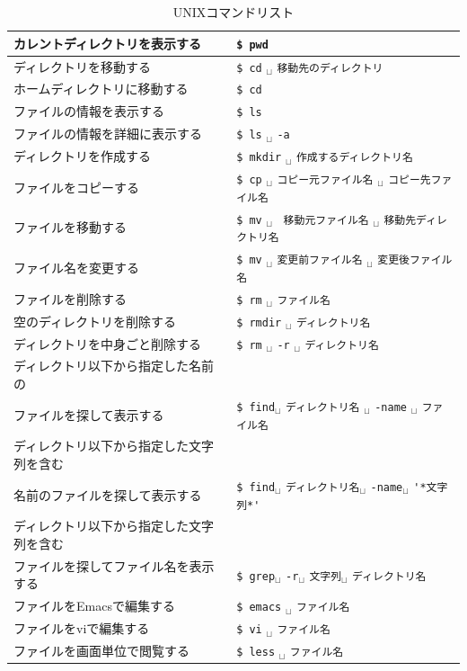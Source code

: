 \documentclass{jarticle}
\begin{document}
\begin{table}[htbp]
  \caption{UNIXコマンドリスト} 
  \label{Tab:UNIXコマンドリスト}
  \begin{center}
     \begin{tabular}{ll}\toprule
      カレントディレクトリを表示する &
      \verb|$ pwd | \\ \midrule
      ディレクトリを移動する &
	  \verb|$ cd| $_\sqcup$ \verb|移動先のディレクトリ | \\ \midrule
      ホームディレクトリに移動する &
	  \verb|$ cd | \\ \midrule
      ファイルの情報を表示する &
	  \verb|$ ls | \\ \midrule
      ファイルの情報を詳細に表示する &
	  \verb|$ ls| $_\sqcup$ \verb|-a| \\ \midrule
      ディレクトリを作成する &
	  \verb|$ mkdir| $_\sqcup$ \verb|作成するディレクトリ名 | \\ \midrule
      ファイルをコピーする&
	  \verb|$ cp| $_\sqcup$ \verb|コピー元ファイル名| $_\sqcup$ \verb|コピー先ファイル名 | \\ \midrule
      ファイルを移動する &
	  \verb|$ mv| $_\sqcup$ \verb| 移動元ファイル名| $_\sqcup$ \verb|移動先ディレクトリ名 | \\ \midrule
     ファイル名を変更する&
	  \verb|$ mv| $_\sqcup$ \verb|変更前ファイル名| $_\sqcup$ \verb|変更後ファイル名 | \\ \midrule
      ファイルを削除する&
	  \verb|$ rm| $_\sqcup$ \verb|ファイル名 | \\ \midrule
      空のディレクトリを削除する&
	  \verb|$ rmdir| $_\sqcup$ \verb|ディレクトリ名 | \\ \midrule
      ディレクトリを中身ごと削除する &
	  \verb|$ rm| $_\sqcup$ \verb|-r| $_\sqcup$ \verb|ディレクトリ名| \\ \midrule
      ディレクトリ以下から指定した名前の\\
      ファイルを探して表示する &
	 \verb|$ find|$_\sqcup$ \verb|ディレクトリ名| $_\sqcup$ \verb|-name| $_\sqcup$ \verb|ファイル名 | \\ \midrule
      ディレクトリ以下から指定した文字列を含む\\
      名前のファイルを探して表示する &
	 \verb|$ find|$_\sqcup$ \verb|ディレクトリ名|$_\sqcup$ \verb|-name|$_\sqcup$ \verb|'*文字列*' | \\ \midrule
      ディレクトリ以下から指定した文字列を含む\\
      ファイルを探してファイル名を表示する &
	 \verb|$ grep|$_\sqcup$ \verb|-r|$_\sqcup$ \verb|文字列|$_\sqcup$ \verb|ディレクトリ名| \\ \midrule
      ファイルをEmacsで編集する&
	  \verb|$ emacs| $_\sqcup$ \verb|ファイル名 | \\ \midrule
      ファイルをviで編集する&
	  \verb|$ vi| $_\sqcup$ \verb|ファイル名 | \\ \midrule
      ファイルを画面単位で閲覧する&
	  \verb|$ less| $_\sqcup$ \verb|ファイル名 | \\ \midrule

     \end{tabular}
  \end{center}
\end{table}



	  
\end{document}
